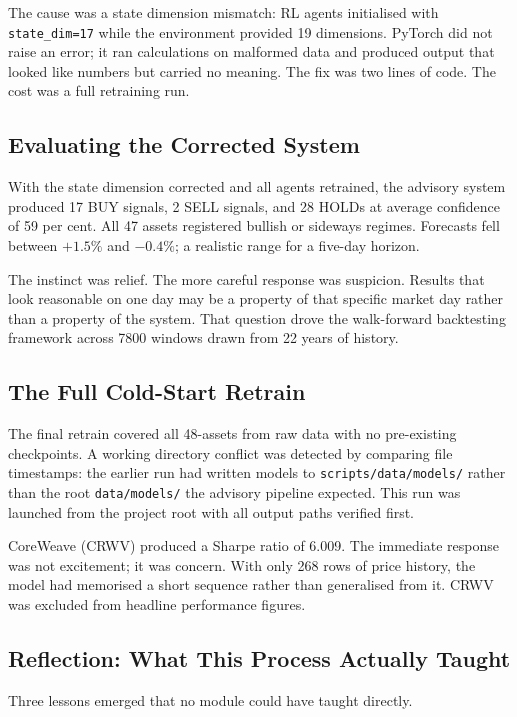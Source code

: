 \documentclass[journal]{IEEEtran}
\begin{document}
The cause was a state dimension mismatch: RL agents initialised with
\texttt{state\_dim=17} while the environment provided 19 dimensions.
PyTorch did not raise an error; it ran calculations on malformed data
and produced output that looked like numbers but carried no meaning.
The fix was two lines of code. The cost was a full retraining run.

\subsection*{Evaluating the Corrected System}

With the state dimension corrected and all agents retrained, the
advisory system produced 17 BUY signals, 2 SELL signals, and 28 HOLDs
at average confidence of 59 per cent. All 47 assets registered bullish
or sideways regimes. Forecasts fell between $+1.5\%$ and $-0.4\%$; a
realistic range for a five-day horizon.

The instinct was relief. The more careful response was suspicion.
Results that look reasonable on one day may be a property of that
specific market day rather than a property of the system. That question
drove the walk-forward backtesting framework across 7800 windows drawn
from 22 years of history.

\subsection*{The Full Cold-Start Retrain}

The final retrain covered all 48-assets from raw data with no
pre-existing checkpoints. A working directory conflict was detected by
comparing file timestamps: the earlier run had written models to
\texttt{scripts/data/models/} rather than the root \texttt{data/models/}
the advisory pipeline expected. This run was launched from the project
root with all output paths verified first.

CoreWeave (CRWV) produced a Sharpe ratio of 6.009. The immediate
response was not excitement; it was concern. With only 268 rows of
price history, the model had memorised a short sequence rather than
generalised from it. CRWV was excluded from headline performance
figures.

\subsection*{Reflection: What This Process Actually Taught}

Three lessons emerged that no module could have taught directly.
\end{document}
